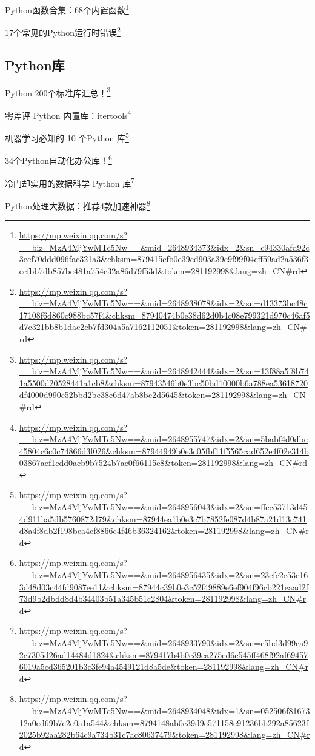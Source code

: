 \documentclass[]{ctexbook}
\renewcommand{\href}[2]{#2\footnote{\url{#1}}}
\begin{document}
\href{https://mp.weixin.qq.com/s?__biz=MzA4MjYwMTc5Nw==\&mid=2648934373\&idx=2\&sn=c94330afd92c3ecf70ddd096fac321a3\&chksm=879415cfb0e39cd903a39e9f99f04cff59ad2a536f3eefbb7db857be481a754c32a86d79f53d\&token=281192998\&lang=zh_CN\#rd}{Python函数合集：68个内置函数}

\href{https://mp.weixin.qq.com/s?__biz=MzA4MjYwMTc5Nw==\&mid=2648938078\&idx=2\&sn=d13373bc48c17108f6d860c988bc57f4\&chksm=87940474b0e38d62d0b4c08e799321d970c46af5d7c321bb8b1dac2cb7fd304a5a7162112051\&token=281192998\&lang=zh_CN\#rd}{17个常见的Python运行时错误}

\hypertarget{pythonux5e93}{%
\subsection{Python库}\label{pythonux5e93}}

\href{https://mp.weixin.qq.com/s?__biz=MzA4MjYwMTc5Nw==\&mid=2648942444\&idx=2\&sn=13f88a5f8b741a5500d20528441a1cb8\&chksm=87943546b0e3bc50bd10000b6a788ea53618720df4000d990e52bbd2be38e6d47ab8be2d5645\&token=281192998\&lang=zh_CN\#rd}{Python 200个标准库汇总！}

\href{https://mp.weixin.qq.com/s?__biz=MzA4MjYwMTc5Nw==\&mid=2648955747\&idx=2\&sn=5babf4d0dbe45804c6c0c74866d3f026\&chksm=87944949b0e3c05fbf11f5565cad652e4f02e314b03867aef1cdd0acb9b7524b7ae0f66115e8\&token=281192998\&lang=zh_CN\#rd}{零差评 Python 内置库：itertools}

\href{https://mp.weixin.qq.com/s?__biz=MzA4MjYwMTc5Nw==\&mid=2648956043\&idx=2\&sn=ffec53713d454d911ba5db5760872d79\&chksm=87944ea1b0e3c7b7852fe087d4b87a21d13c741d8a4f8db2f198bea4cf8866c4f46b36324162\&token=281192998\&lang=zh_CN\#rd}{机器学习必知的 10 个Python 库}

\href{https://mp.weixin.qq.com/s?__biz=MzA4MjYwMTc5Nw==\&mid=2648956435\&idx=2\&sn=23efe2e53e163d48d03c44fd9087ee11\&chksm=87944c39b0e3c52f49889e6ef904f96cb221eaad2f73d9b2dbdd8d4b34403b51a345b51c2804\&token=281192998\&lang=zh_CN\#rd}{34个Python自动化办公库！}

\href{https://mp.weixin.qq.com/s?__biz=MzA4MjYwMTc5Nw==\&mid=2648933790\&idx=2\&sn=c5bd3d99ca92c7305d26ad14484d1824\&chksm=879417b4b0e39ea275ed6c545ff468f92af694576019a5cd365201b3c3fe94a4549121d8a5de\&token=281192998\&lang=zh_CN\#rd}{冷门却实用的数据科学 Python 库}

\href{https://mp.weixin.qq.com/s?__biz=MzA4MjYwMTc5Nw==\&mid=2648934048\&idx=1\&sn=052506f8167312a0ed69b7e2e0a1a544\&chksm=8794148ab0e39d9c571158e91236bb292a85623f2025b92aa282b64c9a734b31c7ac80637479\&token=281192998\&lang=zh_CN\#rd}{Python处理大数据：推荐4款加速神器}
\end{document}
